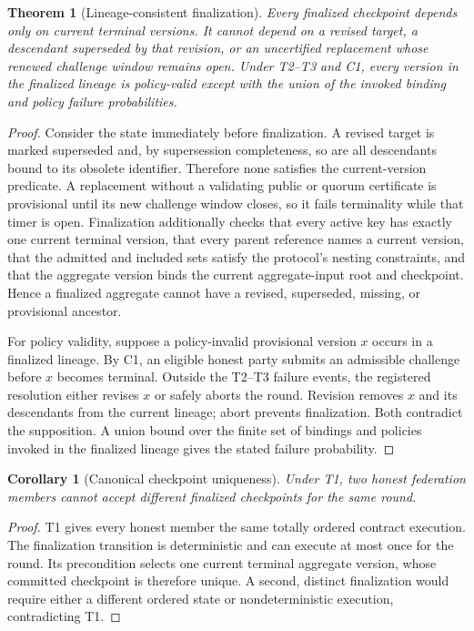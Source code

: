 \documentclass[10pt]{article}
\newtheorem{theorem}{Theorem}
\newtheorem{corollary}{Corollary}
\begin{document}
\begin{theorem}[Lineage-consistent finalization]
Every finalized checkpoint depends only on current terminal versions.  It
cannot depend on a revised target, a descendant superseded by that revision, or
an uncertified replacement whose renewed challenge window remains open.
Under T2--T3 and C1, every version in the finalized lineage is policy-valid
except with the union of the invoked binding and policy failure probabilities.
\end{theorem}
\begin{proof}
Consider the state immediately before finalization.  A revised target is marked
superseded and, by supersession completeness, so are all descendants bound to
its obsolete identifier.  Therefore none satisfies the current-version
predicate.  A replacement without a validating public or quorum certificate is
provisional until its new challenge window closes, so it fails terminality
while that timer is open.  Finalization additionally checks that every active
key has exactly one current terminal version, that every parent reference names
a current version, that the admitted and included sets satisfy the protocol's
nesting constraints, and that the aggregate version binds the current
aggregate-input root and checkpoint.  Hence a finalized aggregate cannot have a
revised, superseded, missing, or provisional ancestor.

For policy validity, suppose a policy-invalid provisional version $x$ occurs in
a finalized lineage.  By C1, an eligible honest party submits an admissible
challenge before $x$ becomes terminal.  Outside the T2--T3 failure events, the
registered resolution either revises $x$ or safely aborts the round.  Revision
removes $x$ and its descendants from the current lineage; abort prevents
finalization.  Both contradict the supposition.  A union bound over the finite
set of bindings and policies invoked in the finalized lineage gives the stated
failure probability.
\end{proof}

\begin{corollary}[Canonical checkpoint uniqueness]
Under T1, two honest federation members cannot accept different finalized
checkpoints for the same round.
\end{corollary}
\begin{proof}
T1 gives every honest member the same totally ordered contract execution.  The
finalization transition is deterministic and can execute at most once for the
round.  Its precondition selects one current terminal aggregate version, whose
committed checkpoint is therefore unique.  A second, distinct finalization
would require either a different ordered state or nondeterministic execution,
contradicting T1.
\end{proof}
\end{document}
